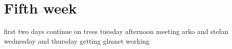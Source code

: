 \chapter{Fifth week}

first two days continue on trees
tuesday afternoon meeting arko and stefan
wednesday and thursday getting glmnet working
